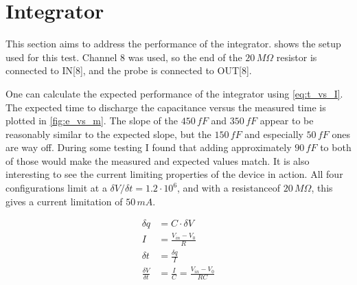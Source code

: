 \documentclass{article}
\begin{document}



\section{Integrator}
This section aims to address the performance of the integrator.  shows the setup used for this test. Channel 8 was used, so the end of the $20\,M\Omega$ resistor is connected to IN[8], and the probe is connected to OUT[8]. 



One can calculate the expected performance of the integrator using \cref{eq:t_vs_I}. The expected time to discharge the capacitance versus the measured time is plotted in \cref{fig:e_vs_m}. The slope of the $450\,fF$ and $350\,fF$ appear to be reasonably similar to the expected slope, but the $150\,fF$ and especially $50\,fF$ ones are way off. During some testing I found that adding approximately $90\,fF$ to both of those would make the measured and expected values match. It is also interesting to see the current limiting properties of the device in action. All four configurations limit at a $\delta V/\delta t=1.2\cdot10^6$, and with a resistanceof $20\,M\Omega$, this gives a current limitation of $50\,mA$.

\begin{align}
	\delta q&=C\cdot \delta V\\
	I&=\frac{V_{in}-V_0}{R}\\
	\delta t&=\frac{\delta q}{I}\\
	\frac{\delta V}{\delta t}&=\frac{I}{C}=\frac{V_{in}-V_0}{RC}\label{eq:t_vs_I}
\end{align}
\end{document}
